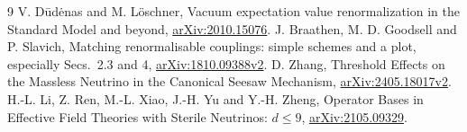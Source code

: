 \documentclass[11pt]{article}
\begin{document}
\begin{thebibliography}{9}
 V. D\=ud\.enas and M. L\"oschner,
Vacuum expectation value renormalization in the Standard Model and beyond,
\href{https://arxiv.org/abs/2010.15076}{arXiv:2010.15076}.
 J. Braathen, M. D. Goodsell and P. Slavich,
Matching renormalisable couplings: simple schemes and a plot,
especially Secs.~2.3 and 4,
\href{https://arxiv.org/html/1810.09388v2}{arXiv:1810.09388v2}.
 D. Zhang,
Threshold Effects on the Massless Neutrino in the Canonical Seesaw Mechanism,
\href{https://arxiv.org/html/2405.18017v2}{arXiv:2405.18017v2}.
 H.-L. Li, Z. Ren, M.-L. Xiao, J.-H. Yu and Y.-H. Zheng,
Operator Bases in Effective Field Theories with Sterile Neutrinos:
$d\leq9$,
\href{https://arxiv.org/abs/2105.09329}{arXiv:2105.09329}.
\end{thebibliography}
\end{document}
